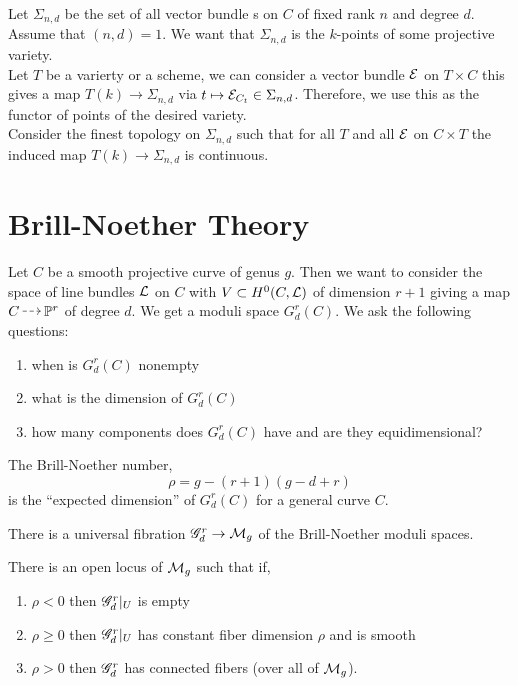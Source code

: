 \documentclass[12pt]{article}
\begin{document}
Let $\Sigma_{n,d}$ be the set of all vector bundle s on $C$ of fixed rank $n$ and degree $d$. Assume that $(n,d) = 1$. We want that $\Sigma_{n,d}$ is the $k$-points of some projective variety.
\bigskip\\
Let $T$ be a varierty or a scheme, we can consider a vector bundle $\mathcal{E}$ on $T \times C$ this gives a map $T(k) \to \Sigma_{n,d}$ via $t \mapsto \mathcal{E}_{C_t} \in \Sigma_{n, d}$. Therefore, we use this as the functor of points of the desired variety.
\bigskip\\
Consider the finest topology on $\Sigma_{n,d}$ such that for all $T$ and all $\mathcal{E}$ on $C \times T$ the induced map $T(k) \to \Sigma_{n,d}$ is continuous. 

\section{Brill-Noether Theory}

Let $C$ be a smooth projective curve of genus $g$. Then we want to consider the space of line bundles $\mathcal{L}$ on $C$ with $V \subset H^0(C, \mathcal{L})$ of dimension $r+1$ giving a map $C \rat \P^r$ of degree $d$. We get a moduli space $G^r_d(C)$. We ask the following questions:

\begin{enumerate}
\item when is $G^r_d(C)$ nonempty
\item what is the dimension of $G^r_d(C)$
\item how many components does $G^r_d(C)$ have and are they equidimensional?
\end{enumerate}

\begin{defn}
The Brill-Noether number,
\[ \rho = g - (r+1) (g - d + r) \]
is the ``expected dimension'' of $G^r_d(C)$ for a general curve $C$.
\end{defn}

\begin{defn}
There is a universal fibration $\mathscr{G}^r_d \to \mathcal{M}_g$ of the Brill-Noether moduli spaces. 
\end{defn}

\begin{theorem}
There is an open locus of $\mathcal{M}_g$ such that if,
\begin{enumerate}
\item $\rho < 0$ then $\mathscr{G}^r_d|_U$ is empty
\item $\rho \ge 0$ then $\mathscr{G}^r_d |_U$ has constant fiber dimension $\rho$ and is smooth
\item $\rho > 0$ then $\mathscr{G}^r_d$ has connected fibers (over all of $\mathcal{M}_g$).
\end{enumerate}
\end{theorem}
\end{document}
